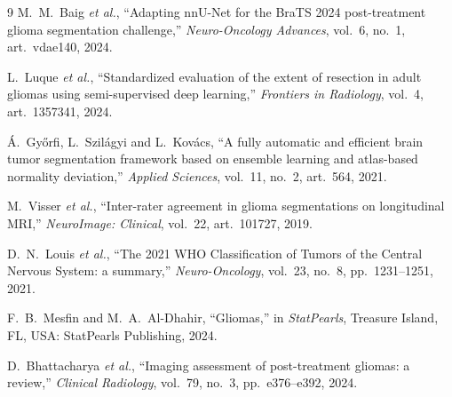 \documentclass[conference]{IEEEtran}
\begin{document}
\begin{thebibliography}{9}
M.~M.~Baig \emph{et al.},
``Adapting nnU-Net for the BraTS 2024 post-treatment glioma
segmentation challenge,''
\emph{Neuro-Oncology Advances}, vol.~6, no.~1, art.~vdae140,
2024.

L.~Luque \emph{et al.},
``Standardized evaluation of the extent of resection in adult
gliomas using semi-supervised deep learning,''
\emph{Frontiers in Radiology}, vol.~4, art.~1357341, 2024.

Á.~Győrfi, L.~Szilágyi and L.~Kovács,
``A fully automatic and efficient brain tumor segmentation
framework based on ensemble learning and atlas-based normality
deviation,''
\emph{Applied Sciences}, vol.~11, no.~2, art.~564, 2021.

M.~Visser \emph{et al.},
``Inter-rater agreement in glioma segmentations on longitudinal
MRI,''
\emph{NeuroImage: Clinical}, vol.~22, art.~101727, 2019.

D.~N.~Louis \emph{et al.},
``The 2021 WHO Classification of Tumors of the Central Nervous
System: a summary,''
\emph{Neuro-Oncology}, vol.~23, no.~8, pp.~1231--1251, 2021.

F.~B.~Mesfin and M.~A.~Al-Dhahir, ``Gliomas,'' in
\emph{StatPearls}, Treasure Island, FL, USA: StatPearls
Publishing, 2024.

D.~Bhattacharya \emph{et al.},
``Imaging assessment of post-treatment gliomas: a review,''
\emph{Clinical Radiology}, vol.~79, no.~3, pp.~e376--e392, 2024.

\end{thebibliography}
\end{document}
